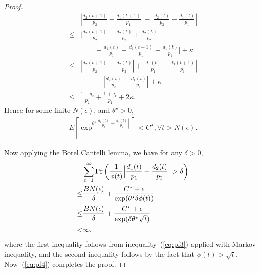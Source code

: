 \documentclass[letterpaper, 10 pt, conference]{ieeeconf}
\begin{document}
\begin{proof}
\begin{align*}
&\left| \frac{d_{2}(t+1)}{p_{2}}	- \frac{d_{1}(t+1)}{p_{1}}\right| - \left| \frac{d_{2}(t)}{p_{2}}	- \frac{d_{1}(t)}{p_{1}}\right| \\
\leq &     \Bigg| \frac{d_{2}(t+1)}{p_{2}}-\frac{d_{2}(t)}{p_{2}}+\frac{d_{2}(t)}{p_{2}}\\
&\qquad+\frac{d_{1}(t)}{p_{1}}	- \frac{d_{1}(t+1)}{p_{1}}-\frac{d_{1}(t)}{p_{1}}\Bigg| + \kappa \\
\leq& \left| \frac{d_{2}(t+1)}{p_{2}}-\frac{d_{2}(t)}{p_{2}} \right| + \left|\frac{d_{1}(t)}{p_{1}}	- \frac{d_{1}(t+1)}{p_{1}}\right|\\
&\qquad+ \left| \frac{d_{2}(t)}{p_{2}}-\frac{d_{1}(t)}{p_{1}} \right| +\kappa \\
\leq &\frac{1+q_{2}}{p_{2}} + \frac{1+q_{1}}{p_{1}} +2\kappa.
\end{align*}
Hence for some finite $N(\epsilon)$, and $\theta^{\star} >0$, 
\begin{align}\label{eq:pf3}
 E[\exp^{\theta^{\star} |\frac{d_{2}(t)}{p_{2}} - \frac{d_{1}(t)}{p_{1}}|}]< C^{\star} , \forall t>N(\epsilon). 
\end{align}

Now applying the Borel Cantelli lemma, we have for any $\delta>0$,
\begin{align}\label{eq:pf4}
&\sum_{t=1}^{\infty} \Pr\left(  \frac{1}{\phi(t)}\Big|\frac{d_{1}(t)}{p_{1}}-\frac{d_{2}(t)}{p_{2}}\Big|  >\delta     \right)  \notag\\
\leq &\frac{BN(\epsilon)}{\delta} + \frac{C^{\star} + \epsilon}{\exp(\theta^{\star} \delta\phi(t) )}  \notag\\
\leq &\frac{BN(\epsilon)}{\delta} +\frac{C^{\star} + \epsilon}{\exp(\delta \theta^{\star}\sqrt{t}) }\notag\\
<&\infty,
\end{align}
where the first inequality follows from inequality~(\ref{eq:pf3}) applied with Markov inequality, and the second inequality follows by the fact that $\phi\left(t\right) > \sqrt{t}$. Now~(\ref{eq:pf4}) completes the proof. 
\end{proof}
\end{document}
